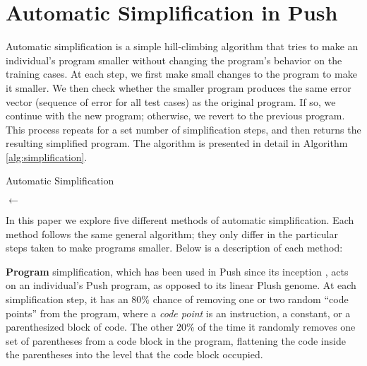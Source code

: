 \section{Automatic Simplification in Push}
\label{sec:simplification}

Automatic simplification is a simple hill-climbing algorithm that tries to make an individual's program smaller without changing the program's behavior on the training cases. At each step, we first make small changes to the program to make it smaller. We then check whether the smaller program produces the same error vector (sequence of error for all test cases) as the original program. If so, we continue with the new program; 
otherwise, we revert to the previous program. This process repeats for a set 
number of simplification steps, and then returns the resulting simplified program. The algorithm is presented in detail in Algorithm \ref{alg:simplification}.

\begin{algorithm}[t]
\caption{Automatic Simplification}
\label{alg:simplification}


\BlankLine

\ErrorVector $\leftarrow$ \ComputeErrors{\Ind} \;
\Return \Ind
\end{algorithm}

In this paper we explore five different methods of automatic simplification. Each method follows the same general algorithm; they only differ in the particular steps taken to make programs smaller. %
Below is a description of each method:

\textbf{Program} simplification, which has been used in Push since its inception \cite{Robinson:2001:GPtieus}, acts on an individual's Push program, as opposed to its linear Plush genome. At each simplification step, it has an 80\% chance of removing one or two random ``code points'' from the program, where a \textit{code point} is an instruction, a constant, or a parenthesized block of code. The other 20\% of the time it randomly removes one set of parentheses from a code block in the program, flattening the code inside the parentheses into the level that the code block occupied.

